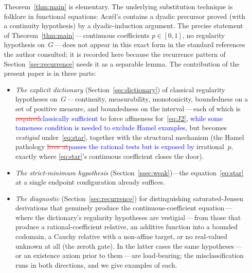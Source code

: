 \documentclass{article}
\newcommand{\ReviewAdd}[1]{\textcolor{blue}{#1}}
\newcommand{\ReviewDel}[1]{\textcolor{red}{\sout{#1}}}
\theoremstyle{plain}
\theoremstyle{definition}
\begin{document}
Theorem~\ref{thm:main} is elementary. The underlying substitution
technique is folklore in functional equations: Acz\'el's
\cite[\S2.1.4]{Aczel1966} contains a dyadic precursor proved (with a
continuity hypothesis) by a dyadic-induction argument. The precise
statement of Theorem~\ref{thm:main}\,---\,continuous coefficients
$p\in[0,1]$, no regularity hypothesis on~$G$\,---\,does not appear in
this exact form in the standard references the author consulted; it is
recorded here because the recurrence pattern of
Section~\ref{sec:recurrence} needs it as a separable lemma. The
contribution of the present paper is in three parts:
\begin{itemize}
\item \emph{The explicit dictionary} (Section~\ref{sec:dictionary}) of
  classical regularity hypotheses on~$G$\,---\,continuity, measurability,
  monotonicity, boundedness on a set of positive measure, and
  boundedness on the interval\,---\,each of which is \ReviewDel{required}\ReviewAdd{classically sufficient} to force
  affineness for~\eqref{eq:J2}\ReviewAdd{, while some tameness condition is needed to exclude Hamel examples,} but becomes \emph{vestigial}
  under~\eqref{eq:star}, together with the structural mechanism (the
  Hamel pathology \ReviewDel{lives at}\ReviewAdd{passes the rational tests but is exposed by} irrational~$p$, exactly where
  \eqref{eq:star}'s continuous coefficient closes the door).

\item \emph{The strict-minimum hypothesis}
  (Section~\ref{ssec:weak})---the
  equation~\eqref{eq:star} at a single endpoint configuration already
  suffices.

\item \emph{The diagnostic} (Section~\ref{sec:recurrence}) for
  distinguishing saturated-Jensen derivations that genuinely produce
  the continuous-coefficient equation\,---\,where the dictionary's
  regularity hypotheses are vestigial\,---\,from those that produce a
  rational-coefficient relative, an additive function into a bounded
  codomain, a Cauchy relative with a non-affine target, or no
  real-valued unknown at all (the zeroth gate). In the
  latter cases the same hypotheses\,---\,or an existence axiom prior
  to them\,---\,are load-bearing; the
  misclassification runs in both directions, and we give examples of
  each.
\end{itemize}
\end{document}
